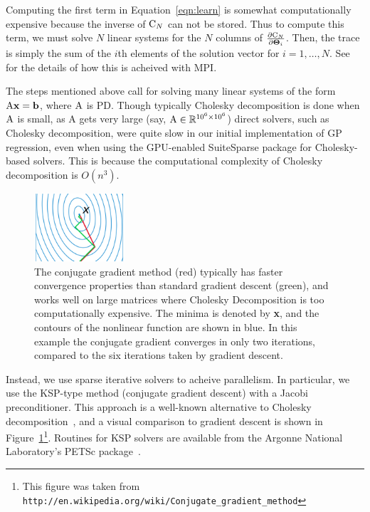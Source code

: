 Computing the first term in Equation~\ref{eqn:learn} is somewhat computationally expensive
because the inverse of $\mathrm{C}_N$ can not be stored.  Thus to compute this term, we must
solve $N$ linear systems for the $N$ columns of $\frac{\partial \mathrm{C}_N}{\partial
  {\boldsymbol \Theta}_i}$.  Then, the trace is simply the sum of the $i$th elements of
the solution vector for $i = 1,\dots,N$.  See  for the details
of how this is acheived with \ac{MPI}.

The steps mentioned above call for solving many linear systems of the form $\mathrm{A} {\bf
  x} = {\bf b}$, where $\mathrm{A}$ is \ac{PD}.  Though typically Cholesky decomposition is
done when $\mathrm{A}$ is small, as A gets very large (say, $\mathrm{A} \in \mathbb{R}^{10^6
  \times 10^6}$) direct solvers, such as Cholesky decomposition, were quite slow in our
initial implementation of \ac{GP} regression, even when using the GPU-enabled SuiteSparse
package for Cholesky-based solvers.  This is because the computational complexity of
Cholesky decomposition is $O(n^3)$.

\begin{figure}[t]
  \begin{center}
    \includegraphics[width=0.3\textwidth]{figures/cg}
    \caption{{\small The conjugate gradient method (red) typically has faster convergence
      properties than standard gradient descent (green), and works well on large matrices
      where Cholesky Decomposition is too computationally expensive.  The minima is
      denoted by {\bf x}, and the contours of the nonlinear function are shown in blue.
      In this example the conjugate gradient converges in only two iterations, compared
      to the six iterations taken by gradient descent.}}
    \label{fig:cg}
  \end{center}
\end{figure}

Instead, we use sparse iterative solvers to acheive parallelism.  In particular, we use
the \ac{KSP}-type method (conjugate gradient descent) with a Jacobi preconditioner.  This
approach is a well-known alternative to Cholesky decomposition~\cite{hestenes1952methods},
and a visual comparison to gradient descent is shown in Figure~\ref{fig:cg}\footnote{This
  figure was taken from
  \texttt{http://en.wikipedia.org/wiki/Conjugate\_gradient\_method}}.  Routines for
\ac{KSP} solvers are available from the Argonne National Laboratory's \ac{PETSc}
package~\cite{petsc-efficient, petsc-user-ref, petsc-web-page}.

